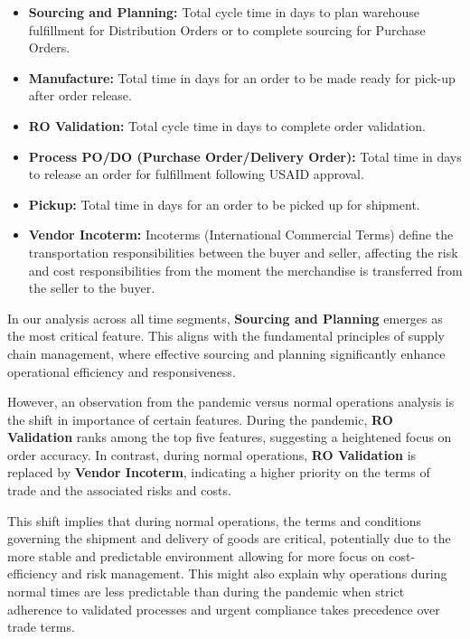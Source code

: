 \documentclass[12pt]{report}
\begin{document}
\begin{itemize}
    \item \textbf{Sourcing and Planning:} Total cycle time in days to plan warehouse fulfillment for Distribution Orders or to complete sourcing for Purchase Orders.
    \item \textbf{Manufacture:} Total time in days for an order to be made ready for pick-up after order release.
    \item \textbf{RO Validation:} Total cycle time in days to complete order validation.
    \item \textbf{Process PO/DO (Purchase Order/Delivery Order):} Total time in days to release an order for fulfillment following USAID approval.
    \item \textbf{Pickup:} Total time in days for an order to be picked up for shipment.
    \item \textbf{Vendor Incoterm:} Incoterms (International Commercial Terms) define the transportation responsibilities between the buyer and seller, affecting the risk and cost responsibilities from the moment the merchandise is transferred from the seller to the buyer.
\end{itemize}

In our analysis across all time segments, \textbf{Sourcing and Planning} emerges as the most critical feature. This aligns with the fundamental principles of supply chain management, where effective sourcing and planning significantly enhance operational efficiency and responsiveness.

However, an observation from the pandemic versus normal operations analysis is the shift in importance of certain features. During the pandemic, \textbf{RO Validation} ranks among the top five features, suggesting a heightened focus on order accuracy. In contrast, during normal operations, \textbf{RO Validation} is replaced by \textbf{Vendor Incoterm}, indicating a higher priority on the terms of trade and the associated risks and costs.

This shift implies that during normal operations, the terms and conditions governing the shipment and delivery of goods are critical, potentially due to the more stable and predictable environment allowing for more focus on cost-efficiency and risk management. This might also explain why operations during normal times are less predictable than during the pandemic when strict adherence to validated processes and urgent compliance takes precedence over trade terms.
\end{document}
